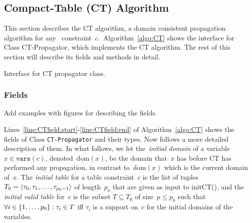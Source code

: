 \documentclass[a4paper,11pt]{article}
\newcommand{\Todo}[1]{{\color{blue}#1}}
\newcommand{\Algoref}[1]{Algorithm~\ref{#1}}
\newcommand{\Table}{\Constraint{Table}~}
\newcommand{\Linesref}[2]{Lines~\ref{#1}-\ref{#2}}
\newcommand{\Dom}[1]{\text{dom}({#1})}
\newcommand{\Dominit}[1]{\underline{\text{dom}}(#1)}
\newcommand{\SparseBitSet}{\texttt{SparseBitSet}}
\newcommand{\Scp}{\texttt{vars}}
\numberwithin{equation}{section}
\begin{document}
\subsection{Compact-Table (CT) Algorithm}
\label{sec:ct}
This section describes the CT algorithm, a domain consistent propagation
algorithm for any \Table constraint~$c$.~\Algoref{algo:CT} shows the interface
for Class CT-Propagator, which implements the CT algorithm. The rest of this
section will describe its fields and methods in detail.


 \begin{algorithm}[H]
  \begin{algorithmic}[1]  %
    
    \end{algorithmic}
  \caption{Interface for CT propagator class.}
  \label{algo:CT}
\end{algorithm}





\subsubsection{Fields}
\label{CT:fields}

\Todo{Add examples with figures for describing the fields.}

\Linesref{line:CTfield:start}{line:CTfield:end} of \Algoref{algo:CT}
shows the fields of Class \texttt{CT-Propagator} and their types.
Now follows a more detailed description of them. In what follows, we let
the~\emph{initial domain} of a variable~$x \in \Scp(c)$, denoted~$\Dominit{x}$,
be the domain that~$x$ has before CT has performed any propagation,
in contrast to~$\Dom{x}$ which is the current domain of~$x$.
The \emph{initial table} for a table constraint~$c$ is the list of tuples
$T_0 = \left\langle\tau_0, \tau_1, \ldots, \tau_{p_0-1}\right\rangle$ of length~$p_o$
that are given as input to initCT(), and the
\emph{initial valid table} for~$c$ is the subset $T \subseteq T_0$ of size~$p \leq p_0$
such that~$\forall i \in \left\{1, \ldots, p_0\right\}: \tau_i \in T$ iff $\tau_i$ 
is a support on~$c$ for the initial domains of the variables. 
\end{document}
